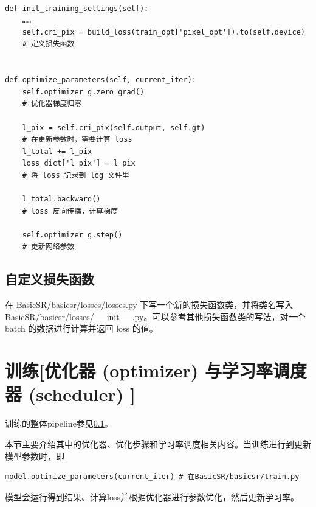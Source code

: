 \documentclass[../main.tex]{subfiles}
\begin{document}
\begin{verbatim}

def init_training_settings(self):
    ……
    self.cri_pix = build_loss(train_opt['pixel_opt']).to(self.device)
    # 定义损失函数


def optimize_parameters(self, current_iter):
    self.optimizer_g.zero_grad()
    # 优化器梯度归零

    l_pix = self.cri_pix(self.output, self.gt)
    # 在更新参数时，需要计算 loss
    l_total += l_pix
    loss_dict['l_pix'] = l_pix
    # 将 loss 记录到 log 文件里

    l_total.backward()
    # loss 反向传播，计算梯度

    self.optimizer_g.step()
    # 更新网络参数
\end{verbatim}

\subsection{自定义损失函数}

在 \href{https://github.com/XPixelGroup/BasicSR/blob/master/basicsr/losses/losses.py}{BasicSR/basicsr/losses/losses.py} 下写一个新的损失函数类，并将类名写入\href{https://github.com/XPixelGroup/BasicSR/blob/master/basicsr/losses/__init__.py}{BasicSR/basicsr/losses/\_\_init\_\_.py}。可以参考其他损失函数类的写法，对一个 batch 的数据进行计算并返回 loss 的值。



\section{训练[优化器 (optimizer) 与学习率调度器 (scheduler) ]}\label{code_structure:training}

\begin{note} %
    训练的整体pipeline参见\ref{}。
\end{note}

本节主要介绍其中的优化器、优化步骤和学习率调度相关内容。当训练进行到更新模型参数时，即
\begin{verbatim}
model.optimize_parameters(current_iter) # 在BasicSR/basicsr/train.py
\end{verbatim}

模型会运行得到结果、计算loss并根据优化器进行参数优化，然后更新学习率。
\end{document}
